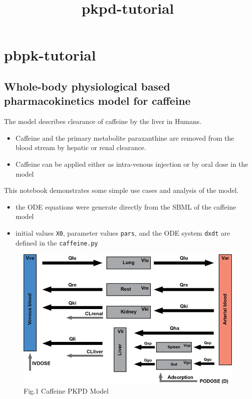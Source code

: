 \documentclass[11pt]{article}
\title{pkpd-tutorial}
\makeatletter
\def\maxwidth{\ifdim\Gin@nat@width>\linewidth\linewidth
    \else\Gin@nat@width\fi}
\let\Oldincludegraphics\includegraphics
\renewcommand{\includegraphics}[1]{\Oldincludegraphics[width=.8\maxwidth]{#1}}
\providecommand{\tightlist}{%
      \setlength{\itemsep}{0pt}\setlength{\parskip}{0pt}}
\makeatother
\begin{document}
    
    
    \maketitle
    
    

    
    \section{pbpk-tutorial}\label{pbpk-tutorial}

\subsection{Whole-body physiological based pharmacokinetics model for
caffeine}\label{whole-body-physiological-based-pharmacokinetics-model-for-caffeine}

The model describes clearance of caffeine by the liver in Humans.

\begin{itemize}
\tightlist
\item
  Caffeine and the primary metabolite paraxanthine are removed from the
  blood stream by hepatic or renal clearance.
\item
  Caffeine can be applied either as intra-venous injection or by oral
  dose in the model
\end{itemize}

This notebook demonstrates some simple use cases and analysis of the
model.

\begin{itemize}
\tightlist
\item
  the ODE equations were generate directly from the SBML of the caffeine
  model
\item
  initial values \texttt{X0}, parameter values \texttt{pars}, and the
  ODE system \texttt{dxdt} are defined in the \texttt{caffeine.py}
\end{itemize}

\begin{figure}[htbp]
\centering
\includegraphics{figures/caffeine_pkpd.png}
\caption{Fig.1 Caffeine PKPD Model}
\end{figure}
\end{document}
